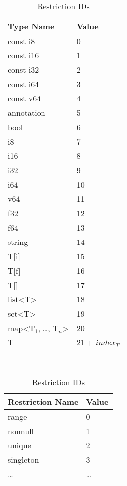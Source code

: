 \begin{table}
\begin{subtable}[t]{5cm}
\centering
\begin{tabular}{l|l}
Type Name & Value \\\hline
const i8 	& 0 \\
const i16 	& 1 \\
const i32 	& 2 \\
const i64 	& 3 \\
const v64 	& 4 \\
annotation	& 5 \\
bool		& 6 \\
i8 		& 7 \\
i16 		& 8 \\
i32 		& 9 \\
i64 		& 10 \\
v64 		& 11 \\
f32 		& 12 \\
f64 		& 13 \\
string		& 14 \\
T[i] 		& 15 \\
T[f] 		& 16 \\
T[] 		& 17 \\
list<T> 	& 18 \\
set<T>	 	& 19 \\
map<T$_1$, \ldots, T$_n$> & 20 \\
T 		& 21 + $index_T$ \\
\end{tabular}
\caption{Type IDs}
\end{subtable}
~
\begin{subtable}[t]{5cm}
\centering
\begin{tabular}{l|l}
Restriction Name & Value \\\hline
range 	& 0 \\
nonnull 	& 1 \\
unique 	& 2 \\
singleton 	& 3 \\
\ldots 	& \ldots \\
\end{tabular}
\caption{Restriction IDs}
\end{subtable}
\end{table}
